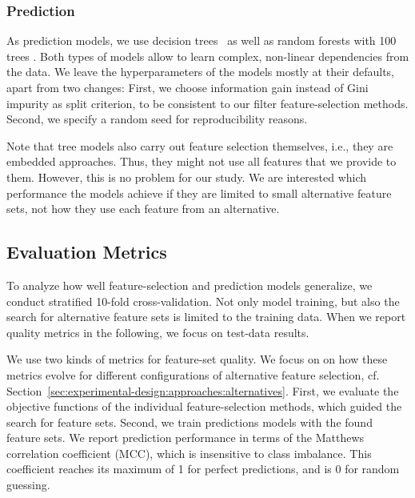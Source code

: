\documentclass{article}
\theoremstyle{definition}
\begin{document}

\subsubsection{Prediction}
\label{sec:experimental-design:approaches:prediction}

As prediction models, we use decision trees~\cite{breiman1984classification} as well as random forests with 100 trees \cite{breiman2001random}.
Both types of models allow to learn complex, non-linear dependencies from the data.
We leave the hyperparameters of the models mostly at their defaults, apart from two changes:
First, we choose information gain instead of Gini impurity as split criterion, to be consistent to our filter feature-selection methods.
Second, we specify a random seed for reproducibility reasons.

Note that tree models also carry out feature selection themselves, i.e., they are embedded approaches.
Thus, they might not use all features that we provide to them.
However, this is no problem for our study.
We are interested which performance the models achieve if they are limited to small alternative feature sets, not how they use each feature from an alternative.

\subsection{Evaluation Metrics}
\label{sec:experimental-design:evaluation}

To analyze how well feature-selection and prediction models generalize, we conduct stratified 10-fold cross-validation.
Not only model training, but also the search for alternative feature sets is limited to the training data.
When we report quality metrics in the following, we focus on test-data results.

We use two kinds of metrics for feature-set quality.
We focus on on how these metrics evolve for different configurations of alternative feature selection, cf. Section~\ref{sec:experimental-design:approaches:alternatives}.
First, we evaluate the objective functions of the individual feature-selection methods, which guided the search for feature sets.
Second, we train predictions models with the found feature sets.
We report prediction performance in terms of the Matthews correlation coefficient (MCC), which is insensitive to class imbalance.
This coefficient reaches its maximum of 1 for perfect predictions, and is 0 for random guessing.
\end{document}
